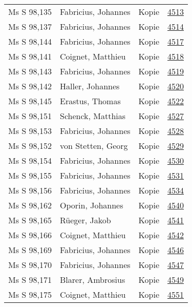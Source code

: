 \documentclass[10pt,a4paper,landscape]{report}
\begin{document}
\begin{longtable}{p{16cm}p{4cm}lr}
Ms S 98,135	&	Fabricius, Johannes	&	Kopie	&	\href{http://130.60.24.72/assignment/4513}{4513}\\
Ms S 98,137	&	Fabricius, Johannes	&	Kopie	&	\href{http://130.60.24.72/assignment/4514}{4514}\\
Ms S 98,144	&	Fabricius, Johannes	&	Kopie	&	\href{http://130.60.24.72/assignment/4517}{4517}\\
Ms S 98,141	&	Coignet, Matthieu	&	Kopie	&	\href{http://130.60.24.72/assignment/4518}{4518}\\
Ms S 98,143	&	Fabricius, Johannes	&	Kopie	&	\href{http://130.60.24.72/assignment/4519}{4519}\\
Ms S 98,142	&	Haller, Johannes	&	Kopie	&	\href{http://130.60.24.72/assignment/4520}{4520}\\
Ms S 98,145	&	Erastus, Thomas	&	Kopie	&	\href{http://130.60.24.72/assignment/4522}{4522}\\
Ms S 98,151	&	Schenck, Matthias	&	Kopie	&	\href{http://130.60.24.72/assignment/4527}{4527}\\
Ms S 98,153	&	Fabricius, Johannes	&	Kopie	&	\href{http://130.60.24.72/assignment/4528}{4528}\\
Ms S 98,152	&	von Stetten, Georg	&	Kopie	&	\href{http://130.60.24.72/assignment/4529}{4529}\\
Ms S 98,154	&	Fabricius, Johannes	&	Kopie	&	\href{http://130.60.24.72/assignment/4530}{4530}\\
Ms S 98,155	&	Fabricius, Johannes	&	Kopie	&	\href{http://130.60.24.72/assignment/4531}{4531}\\
Ms S 98,156	&	Fabricius, Johannes	&	Kopie	&	\href{http://130.60.24.72/assignment/4534}{4534}\\
Ms S 98,162	&	Oporin, Johannes	&	Kopie	&	\href{http://130.60.24.72/assignment/4540}{4540}\\
Ms S 98,165	&	Rüeger, Jakob	&	Kopie	&	\href{http://130.60.24.72/assignment/4541}{4541}\\
Ms S 98,166	&	Coignet, Matthieu	&	Kopie	&	\href{http://130.60.24.72/assignment/4542}{4542}\\
Ms S 98,169	&	Fabricius, Johannes	&	Kopie	&	\href{http://130.60.24.72/assignment/4546}{4546}\\
Ms S 98,170	&	Fabricius, Johannes	&	Kopie	&	\href{http://130.60.24.72/assignment/4547}{4547}\\
Ms S 98,171	&	Blarer, Ambrosius	&	Kopie	&	\href{http://130.60.24.72/assignment/4549}{4549}\\
Ms S 98,175	&	Coignet, Matthieu	&	Kopie	&	\href{http://130.60.24.72/assignment/4551}{4551}\\

\end{longtable}
\end{document}
